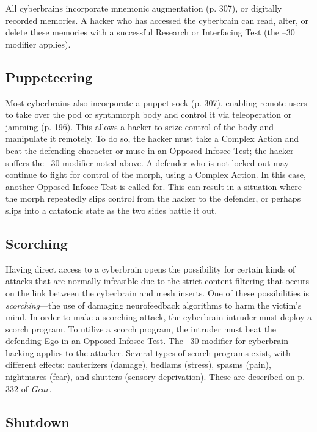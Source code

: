 All cyberbrains incorporate mnemonic augmentation 
(p. 307), or digitally recorded memories. A hacker 
who has accessed the cyberbrain can read, alter, or 
delete these memories with a successful Research or 
Interfacing Test (the –30 modifier applies).

\subsection{Puppeteering}

Most cyberbrains also incorporate a puppet sock (p. 307), 
enabling remote users to take over the pod or synthmorph
body and control it via teleoperation or jamming
(p. 196). This allows a hacker to seize control of the body 
and manipulate it remotely. To do so, the hacker must 
take a Complex Action and beat the defending character 
or muse in an Opposed Infosec Test; the hacker suffers 
the –30 modifier noted above.
A defender who is not locked out may continue 
to fight for control of the morph, using a Complex 
Action. In this case, another Opposed Infosec Test 
is called for. This can result in a situation where the 
morph repeatedly slips control from the hacker to the 
defender, or perhaps slips into a catatonic state as the 
two sides battle it out.

\subsection{Scorching}

Having direct access to a cyberbrain opens the possibility
for certain kinds of attacks that are normally infeasible
due to the strict content filtering that occurs on
the link between the cyberbrain and mesh inserts. One 
of these possibilities is \textit{scorching}—the use of damaging 
neurofeedback algorithms to harm the victim's mind.
In order to make a scorching attack, the cyberbrain 
intruder must deploy a scorch program. To utilize a 
scorch program, the intruder must beat the defending 
Ego in an Opposed Infosec Test. The –30 modifier for 
cyberbrain hacking applies to the attacker.
Several types of scorch programs exist, with different
effects: cauterizers (damage), bedlams (stress),
spasms (pain), nightmares (fear), and shutters (sensory 
deprivation). These are described on p. 332 of \textit{Gear.}

\subsection{Shutdown}

